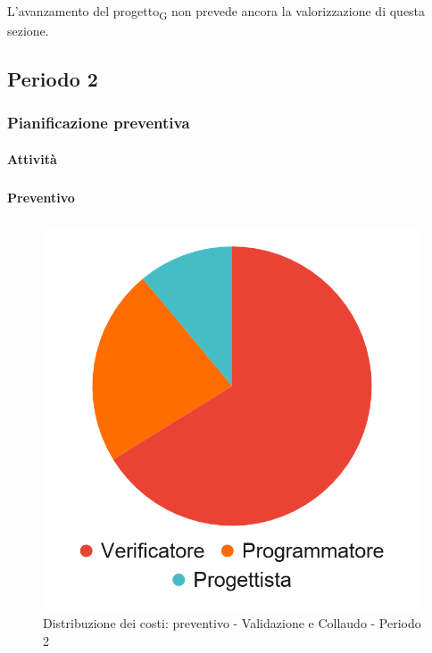 L'avanzamento del progetto\textsubscript{G} non prevede ancora la valorizzazione di questa sezione.




\pagebreak
\subsection{Periodo 2}

\subsubsection{Pianificazione preventiva}

\paragraph{Attività}
\subparagraph*{}

\planningTable{
	
}

\paragraph{Preventivo}
\subparagraph*{}

\hspace{-1cm}
\begin{minipage}{.50\textwidth}
\smallPreventivoTable{
	
}
\end{minipage}
\hspace{1cm}
\begin{minipage}{.40\textwidth}
\begin{figure}[H]
	\includegraphics[scale=0.21]{res/images/charts/preventivo_priori/Grafico4-10.png}
	\caption{Distribuzione dei costi: preventivo - Validazione e Collaudo - Periodo 2}
\end{figure}
\end{minipage} 




